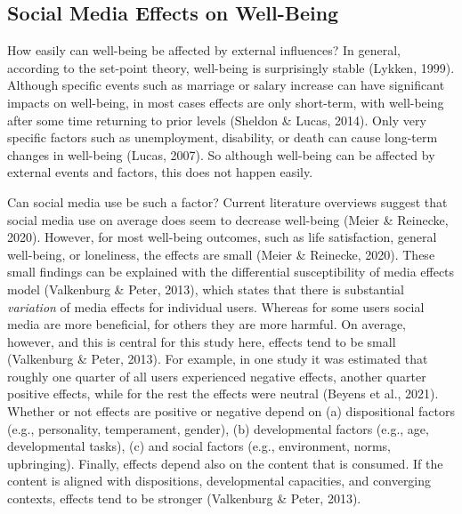 \documentclass[
  man,mask,floatsintext]{apa7}
\begin{document}
\hypertarget{social-media-effects-on-well-being}{%
\subsection{Social Media Effects on Well-Being}\label{social-media-effects-on-well-being}}

How easily can well-being be affected by external influences?
In general, according to the set-point theory, well-being is surprisingly stable (Lykken, 1999).
Although specific events such as marriage or salary increase can have significant impacts on well-being, in most cases effects are only short-term, with well-being after some time returning to prior levels (Sheldon \& Lucas, 2014).
Only very specific factors such as unemployment, disability, or death can cause long-term changes in well-being (Lucas, 2007).
So although well-being can be affected by external events and factors, this does not happen easily.

Can social media use be such a factor?
Current literature overviews suggest that social media use on average does seem to decrease well-being (Meier \& Reinecke, 2020).
However, for most well-being outcomes, such as life satisfaction, general well-being, or loneliness, the effects are small (Meier \& Reinecke, 2020).
These small findings can be explained with the differential susceptibility of media effects model (Valkenburg \& Peter, 2013), which states that there is substantial \emph{variation} of media effects for individual users.
Whereas for some users social media are more beneficial, for others they are more harmful.
On average, however, and this is central for this study here, effects tend to be small (Valkenburg \& Peter, 2013).
For example, in one study it was estimated that roughly one quarter of all users experienced negative effects, another quarter positive effects, while for the rest the effects were neutral (Beyens et al., 2021).
Whether or not effects are positive or negative depend on (a) dispositional factors (e.g., personality, temperament, gender), (b) developmental factors (e.g., age, developmental tasks), (c) and social factors (e.g., environment, norms, upbringing).
Finally, effects depend also on the content that is consumed.
If the content is aligned with dispositions, developmental capacities, and converging contexts, effects tend to be stronger (Valkenburg \& Peter, 2013).
\end{document}
